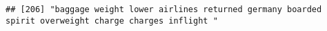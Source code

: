 \documentclass[
]{article}
\begin{document}
\begin{verbatim}
## [206] "baggage weight lower airlines returned germany boarded spirit overweight charge charges inflight "                                                                                                                                                                                                                                                                                                                                                                                                                                                                                                                                                                                                                                                                                                                                                                                                                                                                                                                                                                                                                                                                                                                                                                                                                                                                                                                                                                                                                                                                                                                                                                                                                                                                                             

\end{verbatim}
\end{document}
